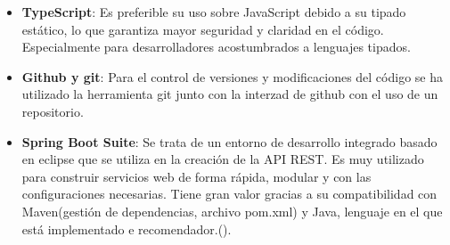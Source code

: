 \begin{itemize}
    \item \textbf{TypeScript}: Es preferible su uso sobre JavaScript debido a su tipado estático, lo que garantiza mayor seguridad y claridad en el código. Especialmente para desarrolladores acostumbrados a lenguajes tipados. 
    \item \textbf{Github y git}: Para el control de versiones y modificaciones del código se ha utilizado la herramienta git junto con la interzad de github con el uso de un repositorio.
    \item \textbf{Spring Boot Suite}: Se trata de un entorno de desarrollo integrado basado en eclipse que se utiliza en la creación de la API REST. Es muy utilizado para construir servicios web de forma rápida, modular y con las configuraciones necesarias. Tiene gran valor gracias a su compatibilidad con Maven(gestión de dependencias, archivo pom.xml) y Java, lenguaje en el que está implementado e recomendador.(\cite{sts}).
\end{itemize}
